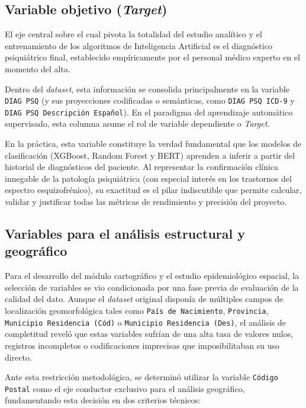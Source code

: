 \documentclass[12pt,a4paper,onecolumn,oneside]{report}
\begin{document}
\subsection{Variable objetivo (\textit{Target})}

El eje central sobre el cual pivota la totalidad del estudio analítico y el entrenamiento de los algoritmos de Inteligencia Artificial es el diagnóstico psiquiátrico final, establecido empíricamente por el personal médico experto en el momento del alta. 

Dentro del \textit{dataset}, esta información se consolida principalmente en la variable \texttt{DIAG PSQ} (y sus proyecciones codificadas o semánticas, como \texttt{DIAG PSQ ICD-9} y \texttt{DIAG PSQ Descripción Español}). En el paradigma del aprendizaje automático supervisado, esta columna asume el rol de variable dependiente o \textit{Target}. 

En la práctica, esta variable constituye la verdad fundamental que los modelos de clasificación (XGBoost, Random Forest y BERT) aprenden a inferir a partir del historial de diagnósticos del paciente. Al representar la confirmación clínica innegable de la patología psiquiátrica (con especial interés en los trastornos del espectro esquizofrénico), su exactitud es el pilar indiscutible que permite calcular, validar y justificar todas las métricas de rendimiento y precisión del proyecto.

\subsection{Variables para el análisis estructural y geográfico}

Para el desarrollo del módulo cartográfico y el estudio epidemiológico espacial, la selección de variables se vio condicionada por una fase previa de evaluación de la calidad del dato. Aunque el \textit{dataset} original disponía de múltiples campos de localización geomorfológica tales como \texttt{País de Nacimiento}, \texttt{Provincia}, \texttt{Municipio Residencia (Cód)} o \texttt{Municipio Residencia (Des)}, el análisis de completitud reveló que estas variables sufrían de una alta tasa de valores nulos, registros incompletos o codificaciones imprecisas que imposibilitaban su uso directo.

Ante esta restricción metodológica, se determinó utilizar la variable \texttt{Código Postal} como el eje conductor exclusivo para el análisis geográfico, fundamentando esta decisión en dos criterios técnicos:
\end{document}
